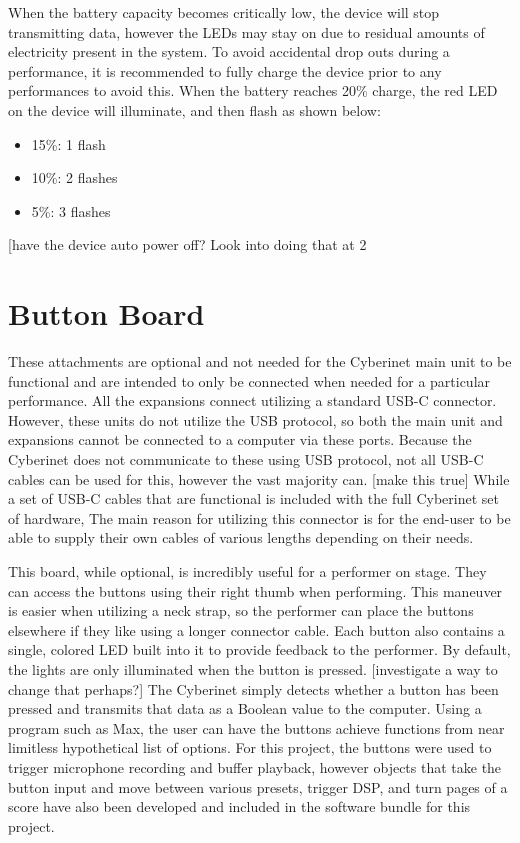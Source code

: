 When the battery capacity becomes critically low, the device will stop transmitting data, however the LEDs may stay on due to residual amounts of electricity present in the system. To avoid accidental drop outs during a performance, it is recommended to fully charge the device prior to any performances to avoid this. When the battery reaches 20\% charge, the red LED on the device will illuminate, and then flash as shown below:

\begin{itemize}
    \item 15\%: 1 flash
    \item 10\%: 2 flashes
    \item 5\%: 3 flashes
\end{itemize}

[have the device auto power off? Look into doing that at 2%


\section{Button Board}

These attachments are optional and not needed for the Cyberinet main unit to be functional and are intended to only be connected when needed for a particular performance. All the expansions connect utilizing a standard USB-C connector. However, these units do not utilize the USB protocol, so both the main unit and expansions cannot be connected to a computer via these ports. Because the Cyberinet does not communicate to these using USB protocol, not all USB-C cables can be used for this, however the vast majority can. [make this true] While a set of USB-C cables that are functional is included with the full Cyberinet set of hardware, The main reason for utilizing this connector is for the end-user to be able to supply their own cables of various lengths depending on their needs. 

This board, while optional, is incredibly useful for a performer on stage. They can access the buttons using their right thumb when performing. This maneuver is easier when utilizing a neck strap, so the performer can place the buttons elsewhere if they like using a longer connector cable. Each button also contains a single, colored LED built into it to provide feedback to the performer. By default, the lights are only illuminated when the button is pressed. [investigate a way to change that perhaps?] The Cyberinet simply detects whether a button has been pressed and transmits that data as a Boolean value to the computer. Using a program such as Max, the user can have the buttons achieve functions from near limitless hypothetical list of options. For this project, the buttons were used to trigger microphone recording and buffer playback, however objects that take the button input and move between various presets, trigger DSP, and turn pages of a score have also been developed and included in the software bundle for this project.


